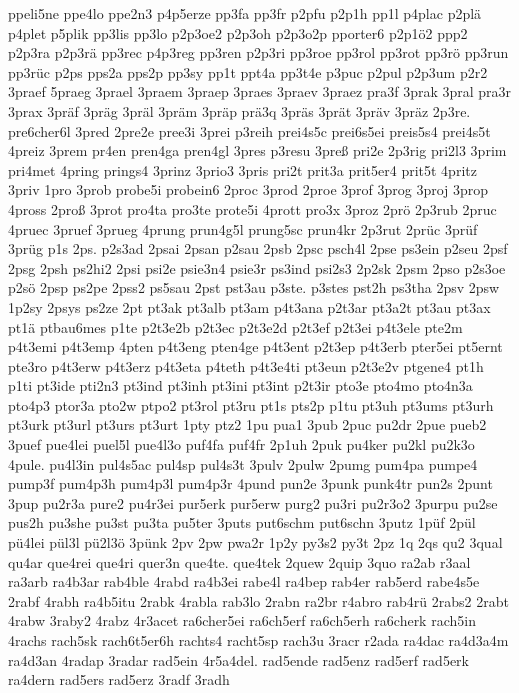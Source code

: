 {ppeli5ne
ppe4lo
ppe2n3
p4p5erze
pp3fa
pp3fr
p2pfu
p2p1h
pp1l
p4plac
p2plä
p4plet
p5plik
pp3lis
pp3lo
p2p3oe2
p2p3oh
p2p3o2p
pporter6
p2p1ö2
ppp2
p2p3ra
p2p3rä
pp3rec
p4p3reg
pp3ren
p2p3ri
pp3roe
pp3rol
pp3rot
pp3rö
pp3run
pp3rüc
p2ps
pps2a
pps2p
pp3sy
pp1t
ppt4a
pp3t4e
p3puc
p2pul
p2p3um
p2r2
3praef
5praeg
3prael
3praem
3praep
3praes
3praev
3praez
pra3f
3prak
3pral
pra3r
3prax
3präf
3präg
3präl
3präm
3präp
prä3q
3präs
3prät
3präv
3präz
2p3re.
pre6cher6l
3pred
2pre2e
pree3i
3prei
p3reih
prei4s5c
prei6s5ei
preis5s4
prei4s5t
4preiz
3prem
pr4en
pren4ga
pren4gl
3pres
p3resu
3preß
pri2e
2p3rig
pri2l3
3prim
pri4met
4pring
prings4
3prinz
3prio3
3pris
pri2t
prit3a
prit5er4
prit5t
4pritz
3priv
1pro
3prob
probe5i
probein6
2proc
3prod
2proe
3prof
3prog
3proj
3prop
4pross
2proß
3prot
pro4ta
pro3te
prote5i
4prott
pro3x
3proz
2prö
2p3rub
2pruc
4pruec
3pruef
3prueg
4prung
prun4g5l
prung5sc
prun4kr
2p3rut
2prüc
3prüf
3prüg
p1s
2ps.
p2s3ad
2psai
2psan
p2sau
2psb
2psc
psch4l
2pse
ps3ein
p2seu
2psf
2psg
2psh
ps2hi2
2psi
psi2e
psie3n4
psie3r
ps3ind
psi2s3
2p2sk
2psm
2pso
p2s3oe
p2sö
2psp
ps2pe
2pss2
ps5sau
2pst
pst3au
p3ste.
p3stes
pst2h
ps3tha
2psv
2psw
1p2sy
2psys
ps2ze
2pt
pt3ak
pt3alb
pt3am
p4t3ana
p2t3ar
pt3a2t
pt3au
pt3ax
pt1ä
ptbau6mes
p1te
p2t3e2b
p2t3ec
p2t3e2d
p2t3ef
p2t3ei
p4t3ele
pte2m
p4t3emi
p4t3emp
4pten
p4t3eng
pten4ge
p4t3ent
p2t3ep
p4t3erb
pter5ei
pt5ernt
pte3ro
p4t3erw
p4t3erz
p4t3eta
p4teth
p4t3e4ti
pt3eun
p2t3e2v
ptgene4
pt1h
p1ti
pt3ide
pti2n3
pt3ind
pt3inh
pt3ini
pt3int
p2t3ir
pto3e
pto4mo
pto4n3a
pto4p3
ptor3a
pto2w
ptpo2
pt3rol
pt3ru
pt1s
pts2p
p1tu
pt3uh
pt3ums
pt3urh
pt3urk
pt3url
pt3urs
pt3urt
1pty
ptz2
1pu
pua1
3pub
2puc
pu2dr
2pue
pueb2
3puef
pue4lei
puel5l
pue4l3o
puf4fa
puf4fr
2p1uh
2puk
pu4ker
pu2kl
pu2k3o
4pule.
pu4l3in
pul4s5ac
pul4sp
pul4s3t
3pulv
2pulw
2pumg
pum4pa
pumpe4
pump3f
pum4p3h
pum4p3l
pum4p3r
4pund
pun2e
3punk
punk4tr
pun2s
2punt
3pup
pu2r3a
pure2
pu4r3ei
pur5erk
pur5erw
purg2
pu3ri
pu2r3o2
3purpu
pu2se
pus2h
pu3she
pu3st
pu3ta
pu5ter
3puts
put6schm
put6schn
3putz
1püf
2pül
pü4lei
pül3l
pü2l3ö
3pünk
2pv
2pw
pwa2r
1p2y
py3s2
py3t
2pz
1q
2qs
qu2
3qual
qu4ar
que4rei
que4ri
quer3n
que4te.
que4tek
2quew
2quip
3quo
ra2ab
r3aal
ra3arb
ra4b3ar
rab4ble
4rabd
ra4b3ei
rabe4l
ra4bep
rab4er
rab5erd
rabe4s5e
2rabf
4rabh
ra4b5itu
2rabk
4rabla
rab3lo
2rabn
ra2br
r4abro
rab4rü
2rabs2
2rabt
4rabw
3raby2
4rabz
4r3acet
ra6cher5ei
ra6ch5erf
ra6ch5erh
ra6cherk
rach5in
4rachs
rach5sk
rach6t5er6h
rachts4
racht5sp
rach3u
3racr
r2ada
ra4dac
ra4d3a4m
ra4d3an
4radap
3radar
rad5ein
4r5a4del.
rad5ende
rad5enz
rad5erf
rad5erk
ra4dern
rad5ers
rad5erz
3radf
3radh
}
